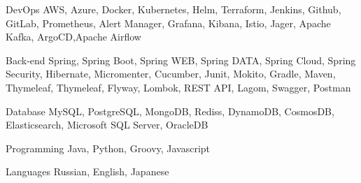 

\begin{cvskills}

  \cvskill
    {DevOps} %
    {AWS, Azure, Docker, Kubernetes, Helm, Terraform, Jenkins, Github, GitLab, Prometheus,
     Alert Manager, Grafana, Kibana, Istio, Jager, Apache Kafka, ArgoCD,Apache Airflow} %

  \cvskill
    {Back-end} %
    {Spring, Spring Boot, Spring WEB, Spring DATA, Spring Cloud, Spring Security, Hibernate, 
    Micromenter, Cucumber, Junit, Mokito, Gradle, Maven, Thymeleaf, Thymeleaf, Flyway, Lombok, REST API, Lagom, Swagger, Postman} %

  \cvskill
    {Database} %
    {MySQL, PostgreSQL, MongoDB, Rediss, DynamoDB, CosmosDB, Elasticsearch,  Microsoft SQL Server, OracleDB} %

  \cvskill
    {Programming} %
    {Java, Python, Groovy, Javascript} %

  \cvskill
    {Languages} %
    {Russian, English, Japanese} %

\end{cvskills}
